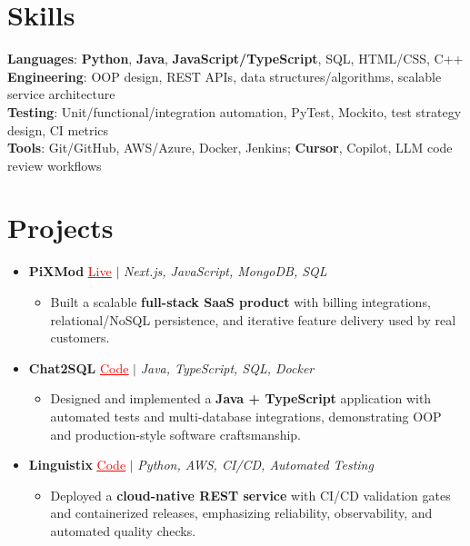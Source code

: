 \documentclass[letterpaper,10pt]{article}
\newcommand{\resumeItem}[1]{\item\small{{#1 \vspace{-2pt}}}}
\newcommand{\resumeProjectHeading}[1]{\item \small #1 \vspace{-2pt}}
\newcommand{\resumeSubHeadingListStart}{\begin{itemize}[leftmargin=0.0in, label={}]}
\newcommand{\resumeSubHeadingListEnd}{\end{itemize}}
\newcommand{\resumeProjItemListStart}{\begin{itemize}[leftmargin=0.15in,label=\textbullet,itemsep=0pt,topsep=0pt,parsep=0pt,partopsep=0pt]}
\newcommand{\resumeProjItemListEnd}{\end{itemize}\vspace{-4pt}}
\begin{document}
\section{Skills}
\begin{itemize}[leftmargin=0.15in, label={}]
\small{\item{
\textbf{Languages}: \textbf{Python}, \textbf{Java}, \textbf{JavaScript/TypeScript}, SQL, HTML/CSS, C++ \\
\textbf{Engineering}: OOP design, REST APIs, data structures/algorithms, scalable service architecture \\
\textbf{Testing}: Unit/functional/integration automation, PyTest, Mockito, test strategy design, CI metrics \\
\textbf{Tools}: Git/GitHub, AWS/Azure, Docker, Jenkins; \textbf{Cursor}, Copilot, LLM code review workflows
}}
\end{itemize}
\vspace{-16pt}
\section{Projects}
\resumeSubHeadingListStart
\vspace{-2pt}
\resumeProjectHeading{\textbf{PiXMod} {\href{https://pixmod.vercel.app/}{\textcolor{red}{\underline{Live}}}} $|$ \emph{Next.js, JavaScript, MongoDB, SQL}}
\resumeProjItemListStart
\resumeItem{Built a scalable \textbf{full-stack SaaS product} with billing integrations, relational/NoSQL persistence, and iterative feature delivery used by real customers.}
\resumeProjItemListEnd
\vspace{3pt}
\resumeProjectHeading{\textbf{Chat2SQL} {\href{https://github.com/SAHAJ-BHADJA/Chat2SQL}{\textcolor{red}{\underline{Code}}}} $|$ \emph{Java, TypeScript, SQL, Docker}}
\resumeProjItemListStart
\resumeItem{Designed and implemented a \textbf{Java + TypeScript} application with automated tests and multi-database integrations, demonstrating OOP and production-style software craftsmanship.}
\resumeProjItemListEnd
\vspace{3pt}
\resumeProjectHeading{\textbf{Linguistix} {\href{https://github.com/SAHAJ-BHADJA/Linguistix}{\textcolor{red}{\underline{Code}}}} $|$ \emph{Python, AWS, CI/CD, Automated Testing}}
\resumeProjItemListStart
\resumeItem{Deployed a \textbf{cloud-native REST service} with CI/CD validation gates and containerized releases, emphasizing reliability, observability, and automated quality checks.}
\resumeProjItemListEnd
\resumeSubHeadingListEnd
\end{document}
